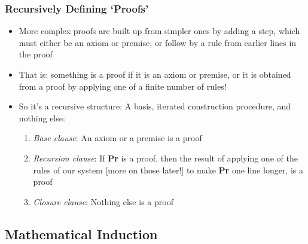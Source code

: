  \begin{frame}
\frametitle{Recursively Defining `Proofs'}

\begin{itemize}[<+->]

\item More complex proofs are built up from simpler ones by adding a step, which must either be an axiom or premise, or follow by a rule from earlier lines in the proof 

\item That is: something is a proof if it is an axiom or premise, or it is obtained from a proof by applying one of a finite number of rules!

\item So it's a recursive structure: A basis, iterated construction procedure, and nothing else:


\begin{enumerate}
\item {\emph{Base clause}}: An axiom or a premise is a proof

\item {\emph{Recursion clause}}: If {\bf{Pr}} is a proof, then the result of applying one of the rules of our system [more on those later!] to make {\bf{Pr}} one line longer, is a proof

\item {\emph{Closure clause}}: Nothing else is a proof
\end{enumerate}

\end{itemize} 
\end{frame}




\subsection{Mathematical Induction}



